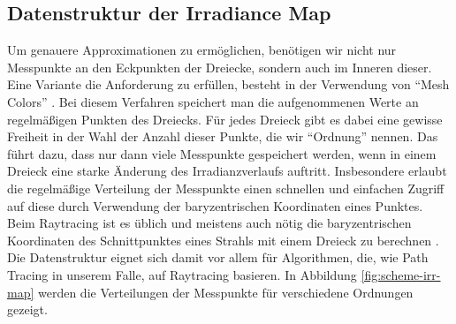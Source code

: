 
	\subsection{Datenstruktur der Irradiance Map} %
	\label{sub:datenstruktur_der_irradiance_map}

		Um genauere Approximationen zu ermöglichen, benötigen wir nicht nur Messpunkte an den Eckpunkten der Dreiecke, sondern auch im Inneren dieser.
		Eine Variante die Anforderung zu erfüllen, besteht in der Verwendung von \enquote{Mesh Colors} \cite{mesh-colors}.
		Bei diesem Verfahren speichert man die aufgenommenen Werte an regelmäßigen Punkten des Dreiecks.
		Für jedes Dreieck gibt es dabei eine gewisse Freiheit in der Wahl der Anzahl dieser Punkte, die wir \enquote{Ordnung} nennen.
		Das führt dazu, dass nur dann viele Messpunkte gespeichert werden, wenn in einem Dreieck eine starke Änderung des Irradianzverlaufs auftritt.
		Insbesondere erlaubt die regelmäßige Verteilung der Messpunkte einen schnellen und einfachen Zugriff auf diese durch Verwendung der baryzentrischen Koordinaten eines Punktes.
		Beim Raytracing ist es üblich und meistens auch nötig die baryzentrischen Koordinaten des Schnittpunktes eines Strahls mit einem Dreieck zu berechnen \cite{ray-triangle-intersection}.
		Die Datenstruktur eignet sich damit vor allem für Algorithmen, die, wie Path Tracing in unserem Falle, auf Raytracing basieren.
		In Abbildung \ref{fig:scheme-irr-map} werden die Verteilungen der Messpunkte für verschiedene Ordnungen gezeigt.

